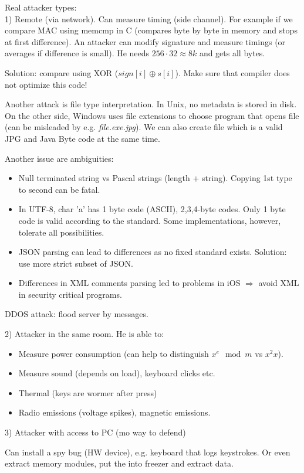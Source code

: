 Real attacker types:\\
1) Remote (via network).
Can measure timing (side channel). For example if we compare MAC using memcmp in C (compares byte by byte in memory and stops at first difference).
An attacker can modify signature and measure timings (or averages if difference is small). He needs $256 \cdot 32 \approx 8k$ and gets all bytes.

Solution: compare using XOR ($sign[i] \oplus s[i]$). Make sure that compiler does not optimize this code!

Another attack is file type interpretation. In Unix, no metadata is stored in disk.
On the other side, Windows uses file extensions to choose program that opens file (can be misleaded by e.g. \emph{file.exe.jpg}).
We can also create file which is a valid JPG and Java Byte code at the same time.

Another issue are ambiguities:
\begin{itemize}
	\item Null terminated string vs Pascal strings (length + string). Copying 1st type to second can be fatal.
	\item In UTF-8, char 'a' has 1 byte code (ASCII), 2,3,4-byte codes. Only 1 byte code is valid according to the standard.
		Some implementations, however, tolerate all possibilities.
	\item JSON parsing can lead to differences as no fixed standard exists. Solution: use more strict subset of JSON.
	\item Differences in XML comments parsing led to problems in iOS $\Rightarrow$ avoid XML in security critical programs.
\end{itemize}

DDOS attack: flood server by messages.

2) Attacker in the same room. He is able to:
\begin{itemize}
	\item Measure power consumption (can help to distinguish $x^e \mod m$ vs $x^2 x $).
	\item Measure sound (depends on load), keyboard clicks etc.
	\item Thermal (keys are wormer after press)
	\item Radio emissions (voltage spikes), magnetic emissions.
\end{itemize}

3) Attacker with access to PC (mo way to defend)

Can install a spy bug (HW device), e.g. keyboard that logs keystrokes. Or even extract memory modules, put the into freezer and extract data.

